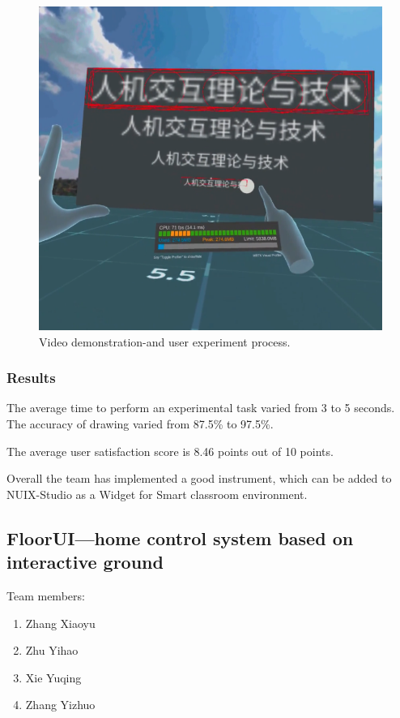\begin{figure}
  \centering
  \includegraphics[width=0.9\linewidth]{figures/Project_9.png}
  \caption{Video demonstration-and user experiment process.}
  \label{fig:Project9-figure}
\end{figure}


\subsubsection{Results}

The average time to perform an experimental task varied from 3 to 5 seconds. The accuracy of drawing varied from 87.5\% to 97.5\%.

The average user satisfaction score is 8.46 points out of 10 points.

Overall the team has implemented a good instrument, which can be added to NUIX-Studio as a Widget for Smart classroom environment.

\subsection{FloorUI—home control system based on interactive ground}

Team members:
\begin{enumerate}
    \item Zhang Xiaoyu
    \item Zhu Yihao
    \item Xie Yuqing
    \item Zhang Yizhuo
\end{enumerate}



